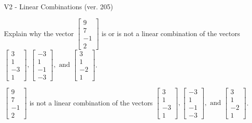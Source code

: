 \begin{exercise}
  \begin{exerciseTitle}V2 - Linear Combinations (ver. 205)\end{exerciseTitle}
  \begin{exerciseStatement}
    Explain why the vector \(\left[\begin{array}{c}
9 \\
7 \\
-1 \\
2
\end{array}\right]\)  is or is not a linear 
	combination of the vectors \(\left[\begin{array}{c}
3 \\
1 \\
-3 \\
1
\end{array}\right] , \left[\begin{array}{c}
-3 \\
1 \\
-1 \\
-3
\end{array}\right] , \text{ and } \left[\begin{array}{c}
3 \\
1 \\
-2 \\
1
\end{array}\right]\).
	


  \end{exerciseStatement}
  \begin{exerciseAnswer}
   \(\left[\begin{array}{c}
9 \\
7 \\
-1 \\
2
\end{array}\right]\) 
  	 is not  
	a linear combination of the vectors \(\left[\begin{array}{c}
3 \\
1 \\
-3 \\
1
\end{array}\right] , \left[\begin{array}{c}
-3 \\
1 \\
-1 \\
-3
\end{array}\right] , \text{ and } \left[\begin{array}{c}
3 \\
1 \\
-2 \\
1
\end{array}\right]\).

	
  


  \end{exerciseAnswer}
\end{exercise}
